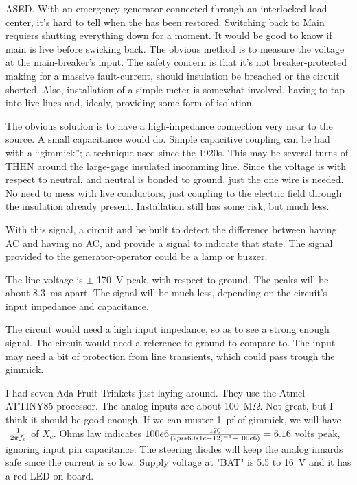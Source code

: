 

\nocon %
\datethis %




ASED.
With an emergency generator connected through an interlocked load-center, it's
hard to tell when the  has been restored.
Switching back to Main requiers shutting  everything down for a moment.
It would be good to know if main is live before swicking back. The obvious
method is to measure the voltage at the main-breaker's input.
The safety concern is that it's not breaker-protected making for a massive
fault-current,
should insulation be breached or the circuit shorted.
Also, installation of a simple meter is somewhat involved, having to tap into
live lines and, idealy, providing some form of isolation.

The obvious solution is to have a high-impedance connection very near to the
source.
A small capacitance would do.
Simple capacitive coupling can be had with a ``gimmick''; a technique used
since the 1920s.
This may be several turns of THHN around the large-gage insulated incomming
line.
Since the voltage is with respect to neutral, and neutral is bonded to ground,
just the one wire is needed.
No need to mess with live conductors, just coupling to the electric field
through the insulation already present. Installation still has some risk, but
much less.

With this signal, a circuit and be built to detect the difference between
having AC and having no AC,
and provide a signal to indicate that state.
The signal provided to the generator-operator could be a lamp or buzzer.

The line-voltage is $\pm$ 170~V peak, with respect to ground.
The peaks will be about 8.3~ms apart.
The signal will be much less, depending on the circuit's input impedance and
capacitance.

The circuit would need a high input impedance, so as to see a strong enough
signal.
The circuit would need a reference to ground to compare to.
The input may need a bit of protection from line transients, which could pass
trough the gimmick.

\fi

I had seven Ada Fruit Trinkets just laying around. They use the Atmel
ATTINY85 processor. The analog inputs are about 100~M$\Omega$. Not great, but
I think it should be good enough. If we can muster 1~pf of gimmick, we will
have $\ {1 \over 2 \pi f_c} $ of $X_c$. Ohms law indicates
$100e6 {170 \over  {(2pi*60*1e-12)^{-1} + 100e6)} } = 6.16 $ volts peak,
ignoring
input pin capacitance. The steering diodes will keep the analog innards safe
since the current is so low. Supply voltage at "BAT" is 5.5 to 16~V and it has
a red LED on-board.


